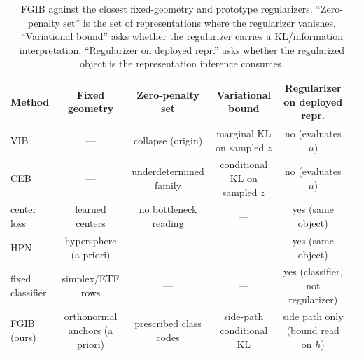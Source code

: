 \begin{table}[t]
\centering
\small
\begin{tabular}{lccccc}
Method & Fixed geometry & Zero-penalty set & Variational bound & Regularizer on deployed repr. \\
\hline
VIB \citep{alemi2017vib} & --- & collapse (origin) & marginal KL on sampled $z$ & no (evaluates $\mu$) \\
CEB \citep{fischer2020ceb} & --- & underdetermined family & conditional KL on sampled $z$ & no (evaluates $\mu$) \\
center loss \citep{wen2016center} & learned centers & no bottleneck reading & --- & yes (same object) \\
HPN \citep{mettes2019hpn} & hypersphere (a priori) & --- & --- & yes (same object) \\
fixed classifier \citep{hoffer2018fix,zhu2021geometric,pernici2019regular} & simplex/ETF rows & --- & --- & yes (classifier, not regularizer) \\
FGIB (ours) & orthonormal anchors (a priori) & prescribed class codes & side-path conditional KL & side path only (bound read on $h$) \\
\end{tabular}
\caption{FGIB against the closest fixed-geometry and prototype regularizers. ``Zero-penalty
set'' is the set of representations where the regularizer vanishes. ``Variational bound''
asks whether the regularizer carries a KL/information interpretation. ``Regularizer on
deployed repr.'' asks whether the regularized object is the representation inference
consumes.}
\label{tab:related}
\end{table}

